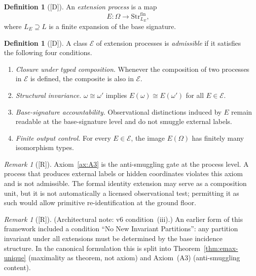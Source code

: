\documentclass[12pt,oneside]{amsbook}
\theoremstyle{plain}
\theoremstyle{definition}
\newtheorem{definition}[theorem]{Definition}
\theoremstyle{remark}
\newtheorem{remark}[theorem]{Remark}
\newcommand{\status}[1]{\textup{[#1]}}
\begin{document}
\begin{definition}[\status{D}]\label{def:ext-process}
An \emph{extension process} is a map
\[
  E: \Omega \to \mathrm{Str}^{\mathrm{fin}}_{L_E},
\]
where $L_E \supseteq L$ is a finite expansion of the base signature.
\end{definition}

\begin{definition}[\status{D}]\label{def:admissible-class}
A class $\mathcal{E}$ of extension processes is \emph{admissible} if
it satisfies the following four conditions.
\begin{enumerate}[label=\textup{(A\arabic*)}]
  \item\label{ax:A1} \emph{Closure under typed composition.}
        Whenever the composition of two processes in $\mathcal{E}$ is
        defined, the composite is also in $\mathcal{E}$.
  \item\label{ax:A2} \emph{Structural invariance.}
        $\omega \cong \omega'$ implies $E(\omega) \cong E(\omega')$ for
        all $E \in \mathcal{E}$.
  \item\label{ax:A3} \emph{Base-signature accountability.}
        Observational distinctions induced by $E$ remain readable at
        the base-signature level and do not smuggle external labels.
  \item\label{ax:A4} \emph{Finite output control.}
        For every $E \in \mathcal{E}$, the image $E(\Omega)$ has
        finitely many isomorphism types.
\end{enumerate}
\end{definition}

\begin{remark}[\status{R}]
Axiom~\ref{ax:A3} is the anti-smuggling gate at the process level.
A process that produces external labels or hidden coordinates violates
this axiom and is not admissible.  The formal identity extension may
serve as a composition unit, but it is not automatically a licensed
observational test; permitting it as such would allow primitive
re-identification at the ground floor.
\end{remark}

\begin{remark}[\status{R}]
\textup{(Architectural note: v6 condition~(iii).)}
An earlier form of this framework included a condition ``No New
Invariant Partitions'': any partition invariant under all
extensions must be determined by the base incidence structure.
In the canonical formulation this is split into
Theorem~\ref{thm:emax-unique} (maximality as theorem, not axiom)
and Axiom~(A3) (anti-smuggling content).
\end{remark}
\end{document}
